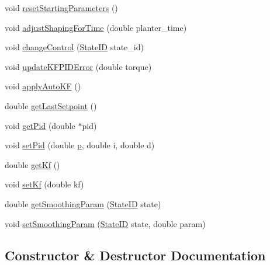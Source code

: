 \begin{DoxyCompactItemize}
\item 
void \hyperlink{classControlModule_a19b05cacdc40d708d14c00c5a41142b5}{reset\+Starting\+Parameters} ()
\item 
void \hyperlink{classControlModule_aee5754ea42ce1a9bae086da2f2ca029c}{adjust\+Shaping\+For\+Time} (double planter\+\_\+time)
\item 
void \hyperlink{classControlModule_affa4c0234bf7883a33b159efb3b1f2dc}{change\+Control} (\hyperlink{States_8hpp_a26aafbeccd8f356b39e1809f1ab9cfdc}{State\+ID} state\+\_\+id)
\item 
void \hyperlink{classControlModule_a5b296b6354c48e2252e89c83b2399475}{update\+K\+F\+P\+I\+D\+Error} (double torque)
\item 
void \hyperlink{classControlModule_a8159eb15ae67becab77531e6080fc6fd}{apply\+Auto\+KF} ()
\item 
double \hyperlink{classControlModule_ac66e25402eeae49116dbea00534a4a22}{get\+Last\+Setpoint} ()
\item 
void \hyperlink{classControlModule_a143642ed467c636cab3c8bf25bbe354e}{get\+Pid} (double $\ast$pid)
\item 
void \hyperlink{classControlModule_a8bab02465545b89adb46b6ccc42ead81}{set\+Pid} (double \hyperlink{Parameters_8hpp_ad1ae3be971981842496c18dabdd2e4c1}{p}, double i, double d)
\item 
double \hyperlink{classControlModule_a36a061b2c4c6ccfb4eb9a8f8bd577b89}{get\+Kf} ()
\item 
void \hyperlink{classControlModule_af2b5bb6c70236be1b00b43c0c357f07d}{set\+Kf} (double kf)
\item 
double \hyperlink{classControlModule_a431dca55f4fcc7935138955183fb5be6}{get\+Smoothing\+Param} (\hyperlink{States_8hpp_a26aafbeccd8f356b39e1809f1ab9cfdc}{State\+ID} state)
\item 
void \hyperlink{classControlModule_a5ebcc624316224590d8cf7856b7283a8}{set\+Smoothing\+Param} (\hyperlink{States_8hpp_a26aafbeccd8f356b39e1809f1ab9cfdc}{State\+ID} state, double param)
\end{DoxyCompactItemize}


\subsection{Constructor \& Destructor Documentation}
